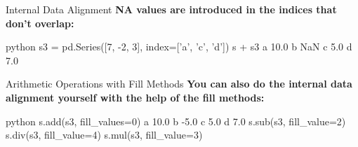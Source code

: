 \begin{myblock}{Internal Data Alignment}
\textbf{NA values are introduced in the indices that don’t overlap:}
\begin{codebox}{python}{}
s3 = pd.Series([7, -2, 3], index=['a', 'c', 'd'])
s + s3
a 10.0
b NaN
c 5.0
d 7.0
\end{codebox}
\end{myblock}

\begin{myblock}{Arithmetic Operations with Fill Methods}
\textbf{You can also do the internal data alignment yourself with the help of the fill methods:}
\begin{codebox}{python}{}
s.add(s3, fill_values=0)
a 10.0
b -5.0
c 5.0
d 7.0
s.sub(s3, fill_value=2)
s.div(s3, fill_value=4)
s.mul(s3, fill_value=3)
\end{codebox}
\end{myblock}
